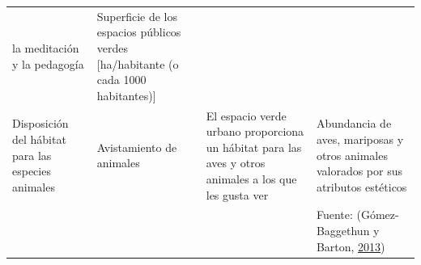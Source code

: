 \documentclass[12pt,a4paper,openany]{book}
\theoremstyle{definition}
\theoremstyle{definition}
\theoremstyle{definition}
\theoremstyle{remark}
\begin{document}
\begin{longtable}[]{@{}llll@{}}
\begin{minipage}[t]{0.19\columnwidth}
la meditación y la pedagogía\strut
\end{minipage} & \begin{minipage}[t]{0.22\columnwidth}\raggedright\strut
Superficie de los espacios públicos verdes {[}ha/habitante (o cada 1000
habitantes){]}\strut
\end{minipage}\tabularnewline
\begin{minipage}[t]{0.26\columnwidth}\raggedright\strut
Disposición del hábitat para las especies animales\strut
\end{minipage} & \begin{minipage}[t]{0.22\columnwidth}\raggedright\strut
Avistamiento de animales\strut
\end{minipage} & \begin{minipage}[t]{0.19\columnwidth}\raggedright\strut
El espacio verde urbano proporciona un hábitat para las aves y otros
animales a los que les gusta ver\strut
\end{minipage} & \begin{minipage}[t]{0.22\columnwidth}\raggedright\strut
Abundancia de aves, mariposas y otros animales valorados por sus
atributos estéticos\strut
\end{minipage}\tabularnewline
\begin{minipage}[t]{0.26\columnwidth}\raggedright\strut
\strut
\end{minipage} & \begin{minipage}[t]{0.22\columnwidth}\raggedright\strut
\strut
\end{minipage} & \begin{minipage}[t]{0.19\columnwidth}\raggedright\strut
\strut
\end{minipage} & \begin{minipage}[t]{0.22\columnwidth}\raggedright\strut
Fuente: (Gómez-Baggethun y Barton,
\protect\hyperlink{ref-gomez-baggethun_classifying_2013}{2013})\strut
\end{minipage}\tabularnewline
\bottomrule
\end{longtable}
\end{document}
